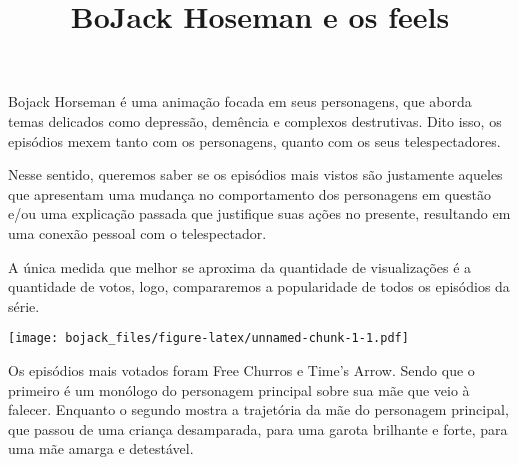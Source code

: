 \documentclass[
]{article}
\title{BoJack Hoseman e os feels}
\author{}
\date{\vspace{-2.5em}}
\newenvironment{Shaded}{\begin{snugshade}}{\end{snugshade}}
\newcommand{\DataTypeTok}[1]{\textcolor[rgb]{0.13,0.29,0.53}{#1}}
\newcommand{\DecValTok}[1]{\textcolor[rgb]{0.00,0.00,0.81}{#1}}
\newcommand{\KeywordTok}[1]{\textcolor[rgb]{0.13,0.29,0.53}{\textbf{#1}}}
\newcommand{\NormalTok}[1]{#1}
\newcommand{\OperatorTok}[1]{\textcolor[rgb]{0.81,0.36,0.00}{\textbf{#1}}}
\newcommand{\StringTok}[1]{\textcolor[rgb]{0.31,0.60,0.02}{#1}}
\begin{document}
\maketitle

Bojack Horseman é uma animação focada em seus personagens, que aborda
temas delicados como depressão, demência e complexos destrutivas. Dito
isso, os episódios mexem tanto com os personagens, quanto com os seus
telespectadores.

Nesse sentido, queremos saber se os episódios mais vistos são justamente
aqueles que apresentam uma mudança no comportamento dos personagens em
questão e/ou uma explicação passada que justifique suas ações no
presente, resultando em uma conexão pessoal com o telespectador.

A única medida que melhor se aproxima da quantidade de visualizações é a
quantidade de votos, logo, compararemos a popularidade de todos os
episódios da série.

\begin{Shaded}
\end{Shaded}

\texttt{[image: bojack\_files/figure-latex/unnamed-chunk-1-1.pdf]}

Os episódios mais votados foram Free Churros e Time's Arrow. Sendo que o
primeiro é um monólogo do personagem principal sobre sua mãe que veio à
falecer. Enquanto o segundo mostra a trajetória da mãe do personagem
principal, que passou de uma criança desamparada, para uma garota
brilhante e forte, para uma mãe amarga e detestável.

\begin{Shaded}
\end{Shaded}
\end{document}
